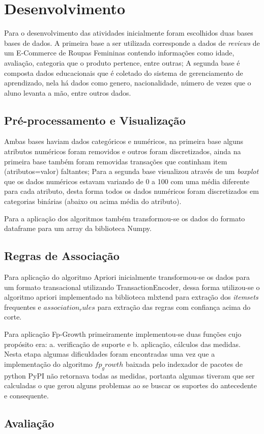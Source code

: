 \chapter{Desenvolvimento}\label{cap_desenv}

Para o desenvolvimento das atividades inicialmente foram escolhidos duas bases bases de dados. A primeira base a ser utilizada corresponde a dados de \textit{reviews} de um E-Commerce de Roupas Femininas contendo informações como idade, avaliação, categoria que o produto pertence, entre outras; A segunda base é composta dados educacionais que é coletado do sistema de gerenciamento de aprendizado, nela há dados como genero, nacionalidade, número de vezes que o aluno levanta a mão, entre outros dados.

\section{Pré-processamento e Visualização}
Ambas bases haviam dados categóricos e numéricos, na primeira base alguns atributos numéricos foram removidos e outros foram discretizados, ainda na primeira base também foram removidas transações que continham item (atributos=valor) faltantes; Para a segunda base visualizou através de um \textit{boxplot} que os dados numéricos estavam variando de 0 a 100 com uma média diferente para cada atributo, desta forma todos os dados numéricos foram discretizados em categorias binárias (abaixo ou acima média do atributo).

Para a aplicação dos algoritmos também transformou-se os dados do formato dataframe para um array da biblioteca Numpy.

\section{Regras de Associação}

Para aplicação do algoritmo Apriori inicialmente transformou-se os dados para um formato transacional utilizando TransactionEncoder, dessa forma utilizou-se o algoritmo apriori implementado na biblioteca mlxtend para extração dos \textit{itemsets} frequentes e $association_rules$ para extração das regras com confiança acima do corte.

Para aplicação Fp-Growth primeiramente implementou-se duas funções cujo propósito era: a. verificação de suporte e b. aplicação, cálculos das medidas. Nesta etapa algumas dificuldades foram encontradas uma vez que a implementação do algoritmo $fp_growth$ baixada pelo indexador de pacotes de python PyPI não retornava todas as medidas, portanta algumas tiveram que ser calculadas o que gerou alguns problemas ao se buscar os suportes do antecedente e consequente.

\section{Avaliação}
